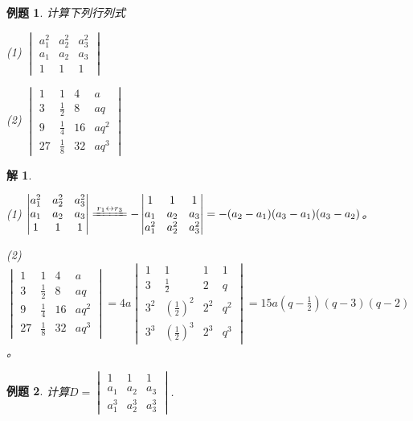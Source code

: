 \documentclass[a4paper]{book}
\newtheorem{eg}{例题}[chapter]
\newtheorem*{solution}{解}
\newcommand{\enum}{\begin{list}{}{\setlength{\leftmargin}{0pt} \setlength{\itemindent}{2.5em} \setlength{\listparindent}{2em}}}
\begin{document}
\begin{eg}
计算下列行列式
\enum
\item[(1)] $\begin{vmatrix}
a_1^2 & a_2^2 & a_3^2 \\ a_1 & a_2 & a_3 \\ 1 & 1 & 1
\end{vmatrix}$
\item[(2)]$\begin{vmatrix}
1 & 1 & 4 & a \\ 3 & \frac12 & 8 & aq \\ 9 & \frac14 & 16 & aq^2 \\ 27 & \frac18 & 32 & aq^3
\end{vmatrix}$
\end{list}
\end{eg}

\begin{solution}\

\enum
\item[(1)] $\begin{vmatrix}
a_1^2 & a_2^2 & a_3^2 \\ a_1 & a_2 & a_3 \\ 1 & 1 & 1
\end{vmatrix} \xlongequal{r_1 \leftrightarrow r_3} - \begin{vmatrix}
1 & 1 & 1 \\ a_1 & a_2 & a_3 \\ a_1^2 & a_2^2 & a_3^2
\end{vmatrix} = -(a_2 - a_1)(a_3 - a_1)(a_3 - a_2)$。
\item[(2)]$\begin{vmatrix}
1 & 1 & 4 & a \\ 3 & \frac12 & 8 & aq \\ 9 & \frac14 & 16 & aq^2 \\ 27 & \frac18 & 32 & aq^3
\end{vmatrix} = 4a \begin{vmatrix}
1 & 1 & 1 & 1 \\ 3 & \frac12 & 2 & q \\ 3^2 & (\frac12)^2 & 2^2 & q^2 \\ 3^3 & (\frac12)^3 & 2^3 & q^3
\end{vmatrix} = 15a(q-\frac12)(q-3)(q-2)$。
\end{list}
\end{solution}

\begin{eg}
计算$D = \begin{vmatrix}
1 & 1 & 1 \\ a_1 & a_2 & a_3 \\ a_1^3 & a_2^3 & a_3^3
\end{vmatrix}$.
\end{eg}
\end{document}
